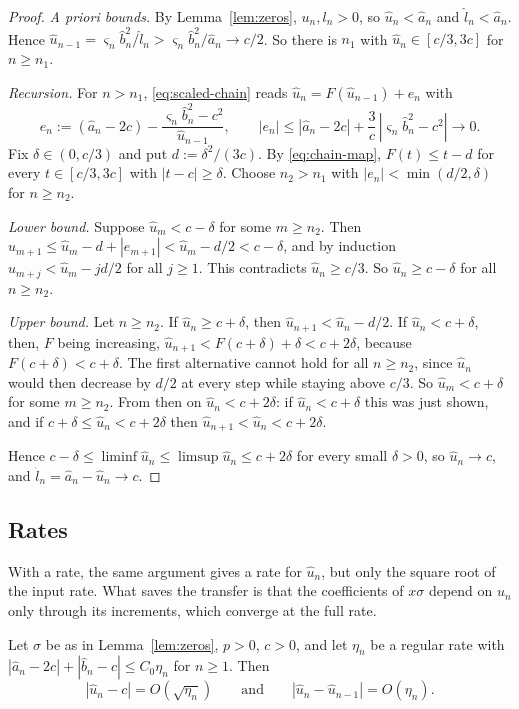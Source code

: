 \begin{proof}
\emph{A priori bounds.} By Lemma~\ref{lem:zeros}, $u_n,l_n>0$, so $\hat u_n<\hat a_n$ and $\hat l_n<\hat a_n$. Hence
$\hat u_{n-1}=\varsigma_n\hat b_n^2/\hat l_n>\varsigma_n\hat b_n^2/\hat a_n\to c/2$. So there is $n_1$ with
$\hat u_n\in[c/3,3c]$ for $n\ge n_1$.

\emph{Recursion.} For $n>n_1$, \eqref{eq:scaled-chain} reads $\hat u_n=F(\hat u_{n-1})+e_n$ with
\[
  e_n:=(\hat a_n-2c)-\frac{\varsigma_n\hat b_n^2-c^2}{\hat u_{n-1}},\qquad
  |e_n|\le|\hat a_n-2c|+\frac3c\,|\varsigma_n\hat b_n^2-c^2|\longrightarrow0 .
\]
Fix $\delta\in(0,c/3)$ and put $d:=\delta^2/(3c)$. By \eqref{eq:chain-map}, $F(t)\le t-d$ for every
$t\in[c/3,3c]$ with $|t-c|\ge\delta$. Choose $n_2>n_1$ with $|e_n|<\min(d/2,\delta)$ for $n\ge n_2$.

\emph{Lower bound.} Suppose $\hat u_m<c-\delta$ for some $m\ge n_2$. Then
$\hat u_{m+1}\le\hat u_m-d+|e_{m+1}|<\hat u_m-d/2<c-\delta$, and by induction $\hat u_{m+j}<\hat u_m-jd/2$ for all
$j\ge1$. This contradicts $\hat u_n\ge c/3$. So $\hat u_n\ge c-\delta$ for all $n\ge n_2$.

\emph{Upper bound.} Let $n\ge n_2$. If $\hat u_n\ge c+\delta$, then $\hat u_{n+1}<\hat u_n-d/2$. If $\hat u_n<c+\delta$,
then, $F$ being increasing, $\hat u_{n+1}<F(c+\delta)+\delta<c+2\delta$, because $F(c+\delta)<c+\delta$. The first
alternative cannot hold for all $n\ge n_2$, since $\hat u_n$ would then decrease by $d/2$ at every step while staying
above $c/3$. So $\hat u_m<c+\delta$ for some $m\ge n_2$. From then on $\hat u_n<c+2\delta$: if $\hat u_n<c+\delta$ this
was just shown, and if $c+\delta\le\hat u_n<c+2\delta$ then $\hat u_{n+1}<\hat u_n<c+2\delta$.

Hence $c-\delta\le\liminf\hat u_n\le\limsup\hat u_n\le c+2\delta$ for every small $\delta>0$, so $\hat u_n\to c$, and
$\hat l_n=\hat a_n-\hat u_n\to c$.
\end{proof}

\subsection{Rates}

With a rate, the same argument gives a rate for $\hat u_n$, but only the square root of the input rate. What saves the
transfer is that the coefficients of $x\sigma$ depend on $\hat u_n$ only through its increments, which converge at the
full rate.

\begin{lemma}\label{lem:chain-rate}
Let $\sigma$ be as in Lemma~\ref{lem:zeros}, $p>0$, $c>0$, and let $\eta_n$ be a regular rate with
$|\hat a_n-2c|+|\hat b_n-c|\le C_0\eta_n$ for $n\ge1$. Then
\[
  |\hat u_n-c|=O(\sqrt{\eta_n})\qquad\text{and}\qquad |\hat u_n-\hat u_{n-1}|=O(\eta_n).
\]
\end{lemma}

